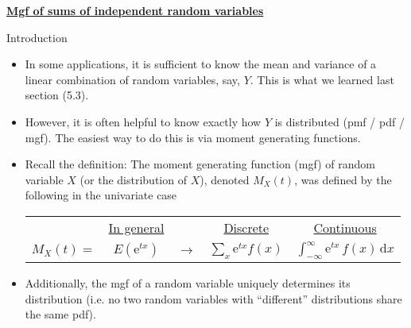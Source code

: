 \documentclass{article}
\newcommand{\bu}[1]{\textbf{\ul{#1}}}				%
\newcommand{\integral}[4]{\displaystyle \int_{#1}^{#2} #3 \,\mathrm{d} #4}		%
\newcommand{\e}{\mathrm{e}}		%
\begin{document}
\bu{Mgf of sums of independent random variables}\bigskip

Introduction\bigskip
\begin{itemize}
    \item In some applications, it is sufficient to know the mean and variance of a linear combination of random variables, say, $Y$. This is what we learned last section (5.3).
    \item[] However, it is often helpful to know exactly how $Y$ is distributed (pmf / pdf / mgf). The easiest way to do this is via moment generating functions.
    \item Recall the definition: The moment generating function (mgf) of random variable $X$ (or the distribution of $X$), denoted $M_X(t)$, was defined by the following in the univariate case\bigskip\\
    \begin{tabular}{c c c c c}
        & \ul{In general} & & \ul{Discrete} & \ul{Continuous}\\
        $M_X(t) = $ & $E(\e^{tx})$ & $\rightarrow$ & $\displaystyle \sum_x \e^{tx} f(x) $ & $\integral{-\infty}{\infty}{\e^{tx} \, f(x)}{x}$\\
    \end{tabular}\bigskip
    \item[] Additionally, the mgf of a random variable uniquely determines its distribution (i.e. no two random variables with ``different'' distributions share the same pdf).
\end{itemize}\bigskip
\end{document}
